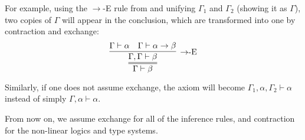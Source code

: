 For example, using the $\rightarrow$-E rule from  and unifying $\Gamma_1$ and $\Gamma_2$ (showing it as $\Gamma$), two copies of $\Gamma$ will appear in the conclusion, which are transformed into one by contraction and exchange:
\[
\infer={\Gamma \vdash \beta}{
    \infer[\mbox{$\rightarrow$-E}]{\Gamma, \Gamma \vdash \beta}{
        \Gamma \vdash \alpha
        &
        \Gamma \vdash \alpha \rightarrow \beta
    }
}
\]

Similarly, if one does not assume exchange, the axiom will become $\Gamma_1, \alpha, \Gamma_2 \vdash \alpha$ instead of simply $\Gamma, \alpha \vdash \alpha$.

From now on, we assume exchange for all of the inference rules, and contraction for the non-linear logics and type systems.